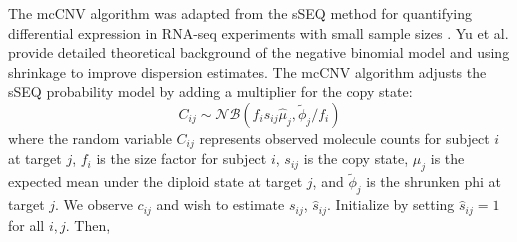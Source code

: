 \documentclass{bmcart}\usepackage[]{graphicx}\usepackage[]{color}
\begin{document}
The mcCNV algorithm was adapted from the sSEQ method for quantifying differential expression in RNA-seq experiments with small sample sizes \cite{yu:2013aa}.
Yu et al. provide detailed theoretical background of the negative binomial model and using shrinkage to improve dispersion estimates.
The mcCNV algorithm adjusts the sSEQ probability model by adding a multiplier for the copy state:
\begin{equation}
  C_{ij} \sim \mathcal{NB}(f_is_{ij}\hat\mu_j, \tilde\phi_j/f_i)
\end{equation}
where the random variable $C_{ij}$ represents observed molecule counts for subject $i$ at target $j$, $f_i$ is the size factor for subject $i$, $s_{ij}$ is the copy state, $\mu_j$ is the expected mean under the diploid state at target $j$, and $\tilde\phi_j$ is the shrunken phi at target $j$.
We observe $c_{ij}$ and wish to estimate $s_{ij}$, $\hat{s}_{ij}$.
Initialize by setting $\hat{s}_{ij} = 1$ for all $i,j$. Then,
\end{document}
